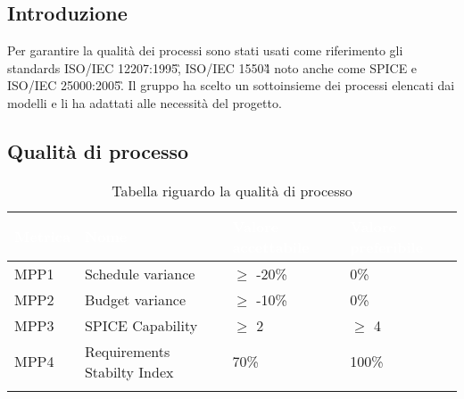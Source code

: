 \subsection{Introduzione}
Per garantire la qualità dei processi sono stati usati come riferimento gli standards 
ISO/IEC 12207:1995\G, ISO/IEC 15504\G{} noto anche come SPICE e ISO/IEC 25000:2005\G.
Il gruppo ha scelto un sottoinsieme dei processi elencati dai modelli e li ha adattati alle 
necessità del progetto.

\subsection{Qualità di processo}
{

    \setlength{\freewidth}{\dimexpr\textwidth-10\tabcolsep}
    \renewcommand{\arraystretch}{1.5}
    \centering
    \setlength{\aboverulesep}{0pt}
    \setlength{\belowrulesep}{0pt}
    \begin{longtable}{C{.257\freewidth} C{.257\freewidth} C{.257\freewidth} C{.257\freewidth}}
       \toprule
    \textcolor{white}{\textbf{Metrica}}&
    \textcolor{white}{\textbf{Nome}}&
    \textcolor{white}{\textbf{Valore accettabile}}&
    \textcolor{white}{\textbf{Valore preferibile}}\\	
    \toprule
    \endhead
    
    
    MPP1 & Schedule variance & $\geq$ -20\% & 0\% \\
    MPP2 & Budget variance & $\geq$ -10\% & 0\% \\
    MPP3 & SPICE Capability & $\geq$ 2 & $\geq$ 4 \\
    MPP4 & Requirements Stabilty Index & 70\% & 100\% \\   
    \bottomrule
    \caption{Tabella riguardo la qualità di processo}
    \end{longtable}
}

